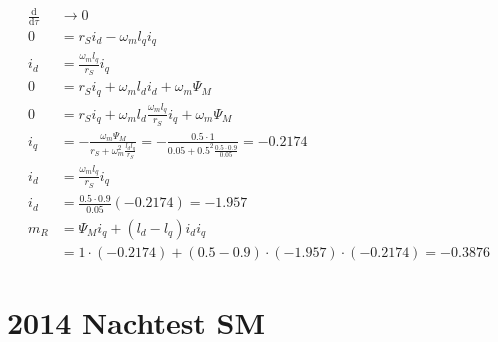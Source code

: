 \documentclass[11pt,a4paper]{scrartcl}
\newcommand{\mybr}[1]{\left(#1\right)}
\newcommand{\0}{_{\mybr{0}}}
\newcommand{\1}{_{\mybr{1}}}
\newcommand{\2}{_{\mybr{2}}}
\renewcommand{\d}{\mathrm{d}}
\begin{document}
\subsection{}
\begin{align}
\frac{\d}{\d\tau} &\rightarrow 0\\
0&=r_S i_d -\omega_m l_q i_q\\
i_d&=\frac{\omega_m l_q}{r_S} i_q\\
0&=r_S i_q+\omega_m l_d i_d + \omega_m\Psi_M \\
0&=r_S i_q+\omega_m l_d \frac{\omega_m l_q}{r_S} i_q + \omega_m\Psi_M \\
i_q&=-\frac{\omega_m \Psi_M}{r_S+\omega_m^2\frac{l_d l_q}{r_S}}=-\frac{\num{0.5}\cdot 1}{\num{0.05}+\num{0.5}^2\frac{\num{0.5}\cdot\num{0.9}}{\num{0.05}}}=\num{-0.2174}\\
i_d&=\frac{\omega_m l_q}{r_S} i_q\\
i_d&=\frac{\num{0.5}\cdot\num{0.9}}{\num{0.05}}\mybr{\num{-0.2174}}=\num{-1.957}\\
m_R&=\Psi_M i_q+\mybr{l_d-l_q}i_d i_q\\
&=1\cdot\mybr{\num{-0.2174}}+\mybr{\num{0.5}-\num{0.9}}\cdot\mybr{\num{-1.957}}\cdot\mybr{{\num{-0.2174}}}=\num{-0.3876}
\end{align}

\clearpage
\part{2014 Nachtest SM}
\end{document}
